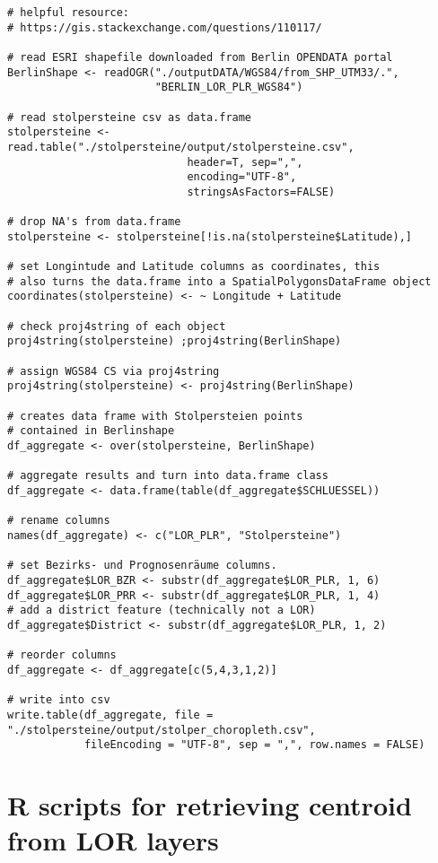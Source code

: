 \begin{lstlisting}[title=R code for aggregating Stolpersteine in LOR boundaries]
# helpful resource:
# https://gis.stackexchange.com/questions/110117/

# read ESRI shapefile downloaded from Berlin OPENDATA portal 
BerlinShape <- readOGR("./outputDATA/WGS84/from_SHP_UTM33/.",
					   "BERLIN_LOR_PLR_WGS84")

# read stolpersteine csv as data.frame
stolpersteine <- read.table("./stolpersteine/output/stolpersteine.csv",
							header=T, sep=",",
							encoding="UTF-8",
							stringsAsFactors=FALSE)

# drop NA's from data.frame
stolpersteine <- stolpersteine[!is.na(stolpersteine$Latitude),]

# set Longintude and Latitude columns as coordinates, this 
# also turns the data.frame into a SpatialPolygonsDataFrame object
coordinates(stolpersteine) <- ~ Longitude + Latitude

# check proj4string of each object
proj4string(stolpersteine) ;proj4string(BerlinShape)

# assign WGS84 CS via proj4string
proj4string(stolpersteine) <- proj4string(BerlinShape)

# creates data frame with Stolpersteien points
# contained in Berlinshape
df_aggregate <- over(stolpersteine, BerlinShape)

# aggregate results and turn into data.frame class
df_aggregate <- data.frame(table(df_aggregate$SCHLUESSEL))

# rename columns
names(df_aggregate) <- c("LOR_PLR", "Stolpersteine")

# set Bezirks- und Prognosenräume columns.
df_aggregate$LOR_BZR <- substr(df_aggregate$LOR_PLR, 1, 6)
df_aggregate$LOR_PRR <- substr(df_aggregate$LOR_PLR, 1, 4)
# add a district feature (technically not a LOR)
df_aggregate$District <- substr(df_aggregate$LOR_PLR, 1, 2)

# reorder columns 
df_aggregate <- df_aggregate[c(5,4,3,1,2)]

# write into csv 
write.table(df_aggregate, file = "./stolpersteine/output/stolper_choropleth.csv",
			fileEncoding = "UTF-8", sep = ",", row.names = FALSE)

\end{lstlisting}

\section{R scripts for retrieving centroid from LOR layers }
\label{app:r_script_centroid}

